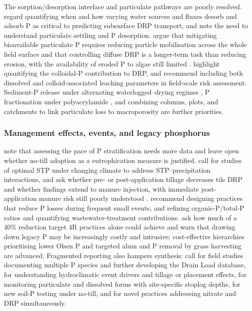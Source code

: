 \documentclass[11pt]{article}
\begin{document}
The sorption/desorption interface and particulate pathways are poorly resolved.
\textcite{Mumbi2025} regard quantifying when and how varying water sources and
fluxes desorb and adsorb P as critical to predicting subsurface DRP transport,
and \textcite{Flores2021} note the need to understand particulate settling and
P desorption. \textcite{Uusitalo2003} argue that mitigating bioavailable
particulate P requires reducing particle mobilisation across the whole field
surface and that controlling diffuse DRP is a longer-term task than reducing
erosion, with the availability of eroded P to algae still limited
\parencite{Ulén2007}. \textcite{Wilson2019} highlight quantifying the colloidal-P
contribution to DRP, and \textcite{Norgaard2013} recommend including both
dissolved and colloid-associated leaching parameters in field-scale risk
assessment. Sediment-P release under alternating waterlogged--drying regimes
\parencite{Nguyen2002}, P fractionation under polyacrylamide \parencite{Jiang2010},
and combining columns, plots, and catchments to link particulate loss to
macroporosity \parencite{Laubel1999} are further priorities.

\subsubsection{Management effects, events, and legacy phosphorus}

\textcite{Uusitalo2018} note that assessing the pace of P stratification needs
more data and leave open whether no-till adoption as a eutrophication measure is
justified. \textcite{Ni2020} call for studies of optimal STP under changing
climate to address STP--precipitation interactions, and \textcite{Wang2018} ask
whether pre- or post-application tillage decreases tile DRP and whether findings
extend to manure injection, with immediate post-application manure risk still
poorly understood \parencite{Madison2014}. \textcite{Brendel2019} recommend
designing practices that reduce P losses during frequent small events, and
\textcite{Schilling2017b} refining organic-P/total-P ratios and quantifying
wastewater-treatment contributions. \textcite{Jarvie2017} ask how much of a 40\%
reduction target 4R practices alone could achieve and warn that drawing down
legacy P may be increasingly costly and intrusive; cost-effective hierarchies
prioritising lower Olsen P and targeted alum \parencite{McDowell2015} and P
removal by grass harvesting \parencite{Zhang2015b} are advanced. Fragmented
reporting also hampers synthesis: \textcite{Christianson2016} call for field
studies documenting multiple P species and further developing the Drain Load
database, \textcite{Macrae2019} for understanding hydroclimatic event drivers
and tillage or placement effects, \textcite{Tanga2025} for monitoring
particulate and dissolved forms with site-specific stoplog depths,
\textcite{Zhang2017} for new soil-P testing under no-till, and \textcite{Spiese2023}
for novel practices addressing nitrate and DRP simultaneously.
\end{document}
